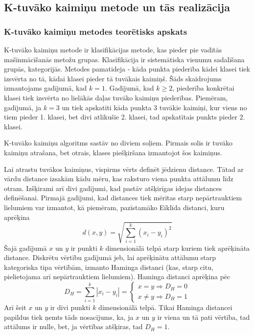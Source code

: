 \documentclass[12pt,paper=a4]{report}
\begin{document}
\subsection{K-tuvāko kaimiņu metode un tās realizācija}
\subsubsection{K-tuvāko kaimiņu metodes teorētisks apskats}
K-tuvāko kaimiņu metode ir klasifikācijas metode, kas pieder pie vadītās mašīnmācīšanās metožu grupas. Klasifikācija ir sistemātiska vienumu sadalīšana grupās, kategorijās. Metodes pamatideja - kāda punkta piederība kādei klasei tiek izsvērta no tā, kādai klasei pieder tā tuvākais kaimiņš. Šāds skaidrojums izmantojams gadījumā, kad $k=1$. Gadījumā, kad $k \geq 2$, piederība konkrētai klasei tiek izsvērta no lielākās daļas tuvāko kaimiņu piederības. Piemēram, gadījumā, ja $k=3$ un tiek apskatīti kāda punkta 3 tuvākie kaimiņi, kur viens no tiem pieder 1. klasei, bet divi atlikušie 2. klasei, tad apskatītais punkts pieder 2. klasei.\cite{knn} \par 
K-tuvāko kaimiņu algoritms sastāv no diviem soļiem. Pirmais solis ir tuvāko kaimiņu atrašana, bet otrais, klases piešķiršana izmantojot šos kaimiņus.\cite{knn} \par
Lai atrastu tuvākos kaimiņus, vispirms vērts definēt jēdzienu distance. Tātad ar vārdu distance izsakām kādu mēru, kas raksturo viena punkta attālumu līdz otram. Izšķirami arī divi gadījumi, kad pastāv atšķirīgas idejas distances definēšanai. Pirmajā gadījumi, kad distances tiek mērītas starp nepārtrauktiem lielumiem var izmantot, kā piemēram, pazīstamāko Eiklīda distanci, kuru aprēķina \[ d(x,y)=\sqrt{\sum_{i=1}^{k} (x_i-y_i)^2} \] Šajā gadījumā $x$ un $y$ ir punkti $k$ dimensionālā telpā starp kuriem tiek aprēķināta distance. Diskrētu vērtību gadījumā jeb, lai aprēķinātu attālumu starp kategoriska tipa vērtībām, izmanto Haminga distanci (kas, starp citu, pielietojama arī nepārtrauktiem lielumiem). Haminga distanci aprēķina pēc \[ D_H=\sum_{i=1}^{k}|x_i - y_i|=
\left\{\begin{matrix}
x=y \Rightarrow D_H=0 \\ 
x\neq y \Rightarrow D_H=1 
\end{matrix}\right.\] Arī šeit $x$ un $y$ ir divi punkti $k$ dimensionālā telpā. Tikai Haminga distancei papildus tiek ņemts tāds nosacījums, ka, ja $x$ un $y$ ir viena un tā pati vērtība, tad attālums ir nulle, bet, ja vērtības atšķiras, tad $D_H=1$.\cite{knndistance} \par
\end{document}
